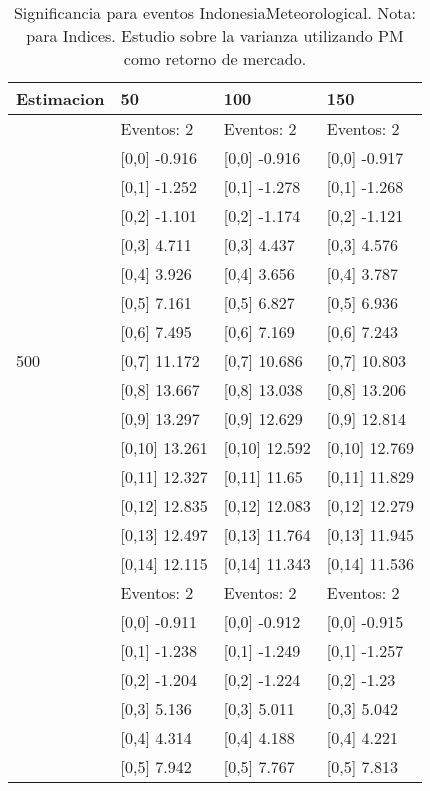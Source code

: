 \begin{table}

\caption{Significancia para eventos IndonesiaMeteorological. Nota: para Indices. Estudio sobre la varianza utilizando PM como retorno de mercado.}
\centering
\begin{tabular}[t]{llll}
\toprule
Estimacion & 50 & 100 & 150\\
\midrule
 & Eventos:  2 & Eventos:  2 & Eventos:  2\\
 & {}[0,0] -0.916 & {}[0,0] -0.916 & {}[0,0] -0.917\\
 & {}[0,1] -1.252 & {}[0,1] -1.278 & {}[0,1] -1.268\\
 & {}[0,2] -1.101 & {}[0,2] -1.174 & {}[0,2] -1.121\\
 & {}[0,3] 4.711 & {}[0,3] 4.437 & {}[0,3] 4.576\\
\addlinespace
 & {}[0,4] 3.926 & {}[0,4] 3.656 & {}[0,4] 3.787\\
 & {}[0,5] 7.161 & {}[0,5] 6.827 & {}[0,5] 6.936\\
 & {}[0,6] 7.495 & {}[0,6] 7.169 & {}[0,6] 7.243\\
500 & {}[0,7] 11.172 & {}[0,7] 10.686 & {}[0,7] 10.803\\
 & {}[0,8] 13.667 & {}[0,8] 13.038 & {}[0,8] 13.206\\
\addlinespace
 & {}[0,9] 13.297 & {}[0,9] 12.629 & {}[0,9] 12.814\\
 & {}[0,10] 13.261 & {}[0,10] 12.592 & {}[0,10] 12.769\\
 & {}[0,11] 12.327 & {}[0,11] 11.65 & {}[0,11] 11.829\\
 & {}[0,12] 12.835 & {}[0,12] 12.083 & {}[0,12] 12.279\\
 & {}[0,13] 12.497 & {}[0,13] 11.764 & {}[0,13] 11.945\\
\addlinespace
 & {}[0,14] 12.115 & {}[0,14] 11.343 & {}[0,14] 11.536\\
 & Eventos:  2 & Eventos:  2 & Eventos:  2\\
 & {}[0,0] -0.911 & {}[0,0] -0.912 & {}[0,0] -0.915\\
 & {}[0,1] -1.238 & {}[0,1] -1.249 & {}[0,1] -1.257\\
 & {}[0,2] -1.204 & {}[0,2] -1.224 & {}[0,2] -1.23\\
\addlinespace
 & {}[0,3] 5.136 & {}[0,3] 5.011 & {}[0,3] 5.042\\
 & {}[0,4] 4.314 & {}[0,4] 4.188 & {}[0,4] 4.221\\
 & {}[0,5] 7.942 & {}[0,5] 7.767 & {}[0,5] 7.813\\

\end{tabular}
\end{table}
